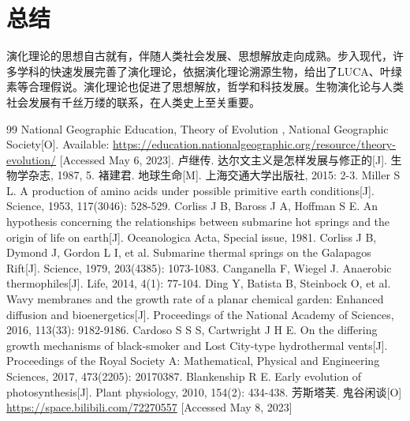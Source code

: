 \documentclass[a4paper]{IEEEtran}
\begin{document}
		\section{总结}
			演化理论的思想自古就有，伴随人类社会发展、思想解放走向成熟。步入现代，许多学科的快速发展完善了演化理论，依据演化理论溯源生物，给出了LUCA、叶绿素等合理假说。演化理论也促进了思想解放，哲学和科技发展。生物演化论与人类社会发展有千丝万缕的联系，在人类史上至关重要。
	\begin{thebibliography}{99}
		 National Geographic Education, Theory of Evolution
		, National Geographic Society[O]. Available: \url{https://education.nationalgeographic.org/resource/theory-evolution/} [Accessed May 6, 2023].
		 卢继传. 达尔文主义是怎样发展与修正的[J]. 生物学杂志, 1987, 5.
		 褚建君. 地球生命[M]. 上海交通大学出版社, 2015: 2-3.
		 Miller S L. A production of amino acids under possible primitive earth conditions[J]. Science, 1953, 117(3046): 528-529.
		 Corliss J B, Baross J A, Hoffman S E. An hypothesis concerning the relationships between submarine hot springs and the origin of life on earth[J]. Oceanologica Acta, Special issue, 1981.
		 Corliss J B, Dymond J, Gordon L I, et al. Submarine thermal springs on the Galapagos Rift[J]. Science, 1979, 203(4385): 1073-1083.
		 Canganella F, Wiegel J. Anaerobic thermophiles[J]. Life, 2014, 4(1): 77-104.
		 Ding Y, Batista B, Steinbock O, et al. Wavy membranes and the growth rate of a planar chemical garden: Enhanced diffusion and bioenergetics[J]. Proceedings of the National Academy of Sciences, 2016, 113(33): 9182-9186.
		 Cardoso S S S, Cartwright J H E. On the differing growth mechanisms of black-smoker and Lost City-type hydrothermal vents[J]. Proceedings of the Royal Society A: Mathematical, Physical and Engineering Sciences, 2017, 473(2205): 20170387.
		 Blankenship R E. Early evolution of photosynthesis[J]. Plant physiology, 2010, 154(2): 434-438.
		 芳斯塔芙. 鬼谷闲谈[O] \url{https://space.bilibili.com/72270557} [Accessed May 8, 2023]
	\end{thebibliography}
\end{document}
